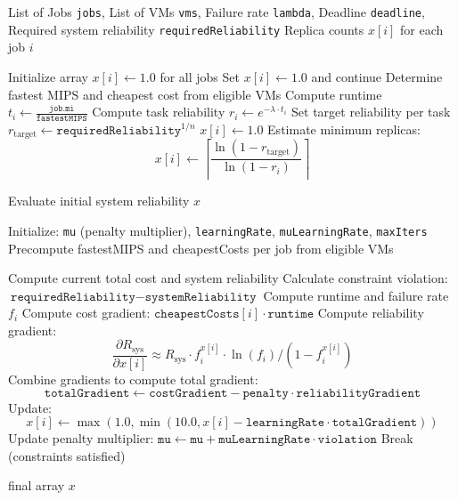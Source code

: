 \documentclass[12pt]{tcc}
\begin{document}
	\begin{algorithm}[H]
\caption{OptimizeReplicaCounts: Replica Optimization under Reliability Constraint}
\label{alg:optimize_replica_counts}
\begin{algorithmic}[1]
\Require List of Jobs \texttt{jobs}, List of VMs \texttt{vms}, Failure rate \texttt{lambda}, Deadline \texttt{deadline}, Required system reliability \texttt{requiredReliability}
\Ensure Replica counts \( x[i] \) for each job \( i \)

\State Initialize array \( x[i] \gets 1.0 \) for all jobs
        \State Set \( x[i] \gets 1.0 \) and continue
    \EndIf
    \State Determine fastest MIPS and cheapest cost from eligible VMs
    \State Compute runtime \( t_i \gets \frac{\texttt{job.mi}}{\texttt{fastestMIPS}} \)
    \State Compute task reliability \( r_i \gets e^{-\lambda \cdot t_i} \)
    \State Set target reliability per task \( r_{\text{target}} \gets \texttt{requiredReliability}^{1/n} \)
        \State \( x[i] \gets 1.0 \)
    \Else
        \State Estimate minimum replicas:
        \[
        x[i] \gets \left\lceil \frac{\ln(1 - r_{\text{target}})}{\ln(1 - r_i)} \right\rceil
        \]
    \EndIf
\EndFor

\State Evaluate initial system reliability
    \State \Return \( x \)
\EndIf

\State Initialize: \texttt{mu} (penalty multiplier), \texttt{learningRate}, \texttt{muLearningRate}, \texttt{maxIters}
\State Precompute fastestMIPS and cheapestCosts per job from eligible VMs

    \State Compute current total cost and system reliability
    \State Calculate constraint violation: \( \texttt{requiredReliability} - \texttt{systemReliability} \)
            \State Compute runtime and failure rate \( f_i \)
            \State Compute cost gradient: \( \texttt{cheapestCosts}[i] \cdot \texttt{runtime} \)
            \State Compute reliability gradient:
            \[
            \frac{\partial R_{\text{sys}}}{\partial x[i]} \approx R_{\text{sys}} \cdot f_i^{x[i]} \cdot \ln(f_i) / (1 - f_i^{x[i]})
            \]
            \State Combine gradients to compute total gradient:
            \[
            \texttt{totalGradient} \gets \texttt{costGradient} - \texttt{penalty} \cdot \texttt{reliabilityGradient}
            \]
            \State Update:
            \[
            x[i] \gets \max\left(1.0, \min\left(10.0, x[i] - \texttt{learningRate} \cdot \texttt{totalGradient} \right)\right)
            \]
        \EndFor
        \State Update penalty multiplier: \( \texttt{mu} \gets \texttt{mu} + \texttt{muLearningRate} \cdot \texttt{violation} \)
    \Else
        \State Break (constraints satisfied)
    \EndIf
\EndFor

\State \Return final array \( x \)
\end{algorithmic}
\end{algorithm}
\end{document}
